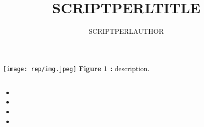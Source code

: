 \documentclass{report}
\title{SCRIPTPERLTITLE}
\author{SCRIPTPERLAUTHOR}
\date{}
\begin{document}
    \maketitle %




\chapter{}
    \section{}
        \paragraph*{}
            \vspace{1cm}
            \begin{center}
                \texttt{[image: rep/img.jpeg]}
                \textbf{Figure 1 :} description.
            \end{center}
    \section{}
        \paragraph*{}
            \begin{itemize} %
                \item
                \item
                \item
                \item
            \end{itemize} 
\end{document}
